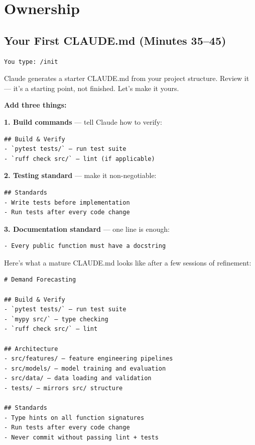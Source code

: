 \documentclass[10pt,oneside]{scrartcl}
\begin{document}
\section{Ownership}

\subsection{Your First CLAUDE.md (Minutes 35--45)}
\label{sec:claudemd}

\begin{verbatim}
You type: /init
\end{verbatim}


Claude generates a starter CLAUDE.md from your project structure. Review it --- it's a starting point, not finished. Let's make it yours.

\textbf{Add three things:}

\textbf{1. Build commands} --- tell Claude how to verify:

\begin{verbatim}
## Build & Verify
- `pytest tests/` — run test suite
- `ruff check src/` — lint (if applicable)
\end{verbatim}

\textbf{2. Testing standard} --- make it non-negotiable:

\begin{verbatim}
## Standards
- Write tests before implementation
- Run tests after every code change
\end{verbatim}

\textbf{3. Documentation standard} --- one line is enough:

\begin{verbatim}
- Every public function must have a docstring
\end{verbatim}


Here's what a mature CLAUDE.md looks like after a few sessions of refinement:

\begin{verbatim}
# Demand Forecasting

## Build & Verify
- `pytest tests/` — run test suite
- `mypy src/` — type checking
- `ruff check src/` — lint

## Architecture
- src/features/ — feature engineering pipelines
- src/models/ — model training and evaluation
- src/data/ — data loading and validation
- tests/ — mirrors src/ structure

## Standards
- Type hints on all function signatures
- Run tests after every code change
- Never commit without passing lint + tests
\end{verbatim}
\end{document}
